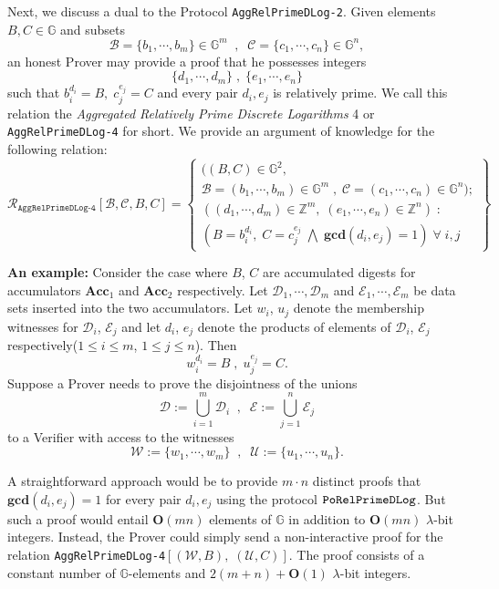 \documentclass[11pt, lettersize, notitlepage, leqno, footskip=0.6cm]{article}
\newcommand{\bz}{\mathbb Z}
\newcommand{\ttt}{\texttt}
\newcommand{\Acc}{\mbf{Acc}}
\newcommand{\mc}{\mathcal}
\newcommand{\mb}{\mathbb}
\newcommand{\mbf}{\mathbf}
\newcommand{\lamb}{\lambda}
\newcommand{\bO}{\mbf{O}}
\newcommand{\vs}{\vspace{-0.15cm}}
\newcommand{\GCD}{\mbf{gcd}}
\numberwithin{equation}{section}
\begin{document}
\bigskip

Next, we discuss a dual to the Protocol \verb|AggRelPrimeDLog-2|. Given elements $B, C\in \mb{G}$ and subsets \vspace{-0.15cm}$$\mc{B} = \{b_1,\cdots, b_m\}\in \mb{G}^m \;\;,\;\; \mc{C} = \{c_1,\cdots, c_n\}\in \mb{G}^n,$$ an honest Prover may provide a proof that he possesses integers \vs $$\{d_1,\cdots, d_m\}\;,\; \{e_1,\cdots, e_n\}$$ such that $b_i^{d_i} = B,\; c_j^{e_j} = C$ and every pair $d_i, e_j$ is relatively prime. We call this relation the \textit{Aggregated Relatively Prime Discrete Logarithms} 4 or \verb|AggRelPrimeDLog-4| for short. We provide an argument of knowledge for the following relation:
\[
  \mc{R}_{\ttt{AggRelPrimeDLog-4}}[\mc{B}, \mc{C}, B, C] = \left\{\begin{array}{l}
    ((B,C)\in\mb{G}^2,\;\\
     \mc{B} = (b_1,\cdots,b_m)\in\mb{G}^m\;,\;\mc{C} = (c_1,\cdots, c_n)\in\mb{G}^n);\\
    ((d_1,\cdots,d_m)\in\bz^m,\; (e_1,\cdots,e_n)\in\bz^n)\;: \\
    (B = b_i^{d_i},\; C = c_j^{e_j}\;\bigwedge \; \GCD(d_i, e_j) = 1)\;\forall \;i,j
  \end{array}\right\}
\] 

\noindent \textbf{An example:} Consider the case where $B$, $C$ are accumulated digests for accumulators $\Acc_1$ and $\Acc_2$ respectively. Let $\mc{D}_1,\cdots,\mc{D}_m$ and $\mc{E}_1,\cdots,\mc{E}_m$ be data sets inserted into the two accumulators. Let $w_i$, $u_j$ denote the membership witnesses for $\mc{D}_i$, $\mc{E}_j$ and let $d_i$, $e_j$ denote the products of elements of $\mc{D}_i$, $\mc{E}_j$ respectively($1\leq i\leq m$, $1\leq j\leq n$). Then $$w_i^{d_i} = B\;,\; u_j^{e_j} = C.$$ Suppose a Prover needs to prove the disjointness of the unions \vs $$\mc{D} := \bigcup\limits_{i=1}^m \mc{D}_i\;\;,\;\;\mc{E} := \bigcup\limits_{j=1}^n \mc{E}_j$$ to a Verifier with access to the witnesses \vs $$\mc{W}:= \{w_1,\cdots,w_m \}\;\;,\;\;\mc{U}:= \{u_1,\cdots,u_n \}.$$

A straightforward approach would be to provide $m\cdot n$ distinct proofs that $\GCD(d_i, e_j) = 1$ for every pair $d_i,e_j$ using the protocol $\tt{PoRelPrimeDLog}$. But such a proof would entail $\mbf{O}(mn)$ elements of $\mb{G}$ in addition to $\mbf{O}(mn)$ $\lamb$-bit integers. Instead, the Prover could simply send a non-interactive proof for the relation \verb|AggRelPrimeDLog-4|$[(\mc{W}, B),\;(\mc{U}, C)]$. The proof consists of a constant number of $\mb{G}$-elements and $2(m+n)+\bO(1)$ $\lamb$-bit integers.\vspace{0.1cm} 
\end{document}
